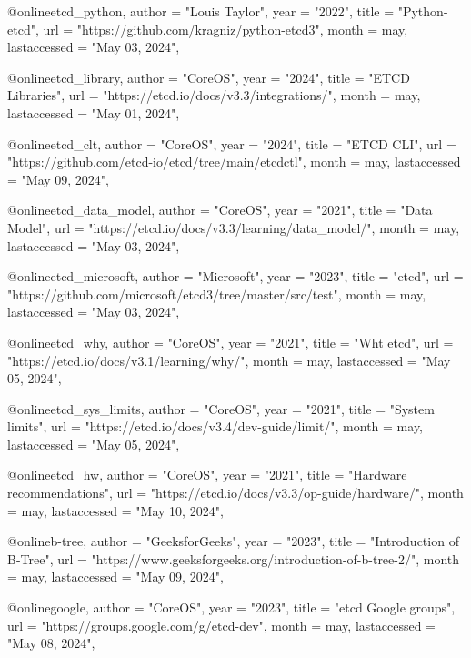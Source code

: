@online{etcd_python,
  author =       "Louis Taylor",
  year =         "2022",
  title =        "Python-etcd",
  url =          "https://github.com/kragniz/python-etcd3",
  month =        may,
  lastaccessed = "May 03, 2024",
}

@online{etcd_library,
  author =       "CoreOS",
  year =         "2024",
  title =        "ETCD Libraries",
  url =          "https://etcd.io/docs/v3.3/integrations/",
  month =        may,
  lastaccessed = "May 01, 2024",
}

@online{etcd_clt,
  author =       "CoreOS",
  year =         "2024",
  title =        "ETCD CLI",
  url =          "https://github.com/etcd-io/etcd/tree/main/etcdctl",
  month =        may,
  lastaccessed = "May 09, 2024",
}

@online{etcd_data_model,
  author =       "CoreOS",
  year =         "2021",
  title =        "Data Model",
  url =          "https://etcd.io/docs/v3.3/learning/data_model/",
  month =        may,
  lastaccessed = "May 03, 2024",
}

@online{etcd_microsoft,
  author =       "Microsoft",
  year =         "2023",
  title =        "etcd",
  url =          "https://github.com/microsoft/etcd3/tree/master/src/test",
  month =        may,
  lastaccessed = "May 03, 2024",
}

@online{etcd_why,
  author =       "CoreOS",
  year =         "2021",
  title =        "Wht etcd",
  url =          "https://etcd.io/docs/v3.1/learning/why/",
  month =        may,
  lastaccessed = "May 05, 2024",
}

@online{etcd_sys_limits,
  author =       "CoreOS",
  year =         "2021",
  title =        "System limits",
  url =          "https://etcd.io/docs/v3.4/dev-guide/limit/",
  month =        may,
  lastaccessed = "May 05, 2024",
}

@online{etcd_hw,
  author =       "CoreOS",
  year =         "2021",
  title =        "Hardware recommendations",
  url =          "https://etcd.io/docs/v3.3/op-guide/hardware/",
  month =        may,
  lastaccessed = "May 10, 2024",
}

@online{b-tree,
  author =       "GeeksforGeeks",
  year =         "2023",
  title =        "Introduction of B-Tree",
  url =          "https://www.geeksforgeeks.org/introduction-of-b-tree-2/",
  month =        may,
  lastaccessed = "May 09, 2024",
}

@online{google,
  author =       "CoreOS",
  year =         "2023",
  title =        "etcd Google groups",
  url =          "https://groups.google.com/g/etcd-dev",
  month =        may,
  lastaccessed = "May 08, 2024",
}

